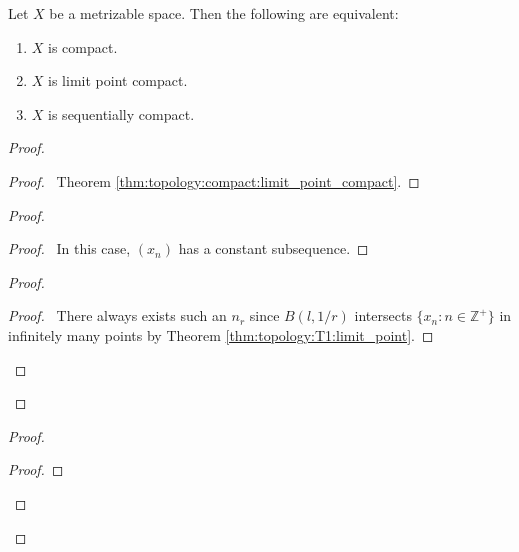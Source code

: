 \begin{thm}[DC]
  Let $X$ be a metrizable space. Then the following are equivalent:
  \begin{enumerate}
    \item $X$ is compact.
    \item $X$ is limit point compact.
    \item $X$ is sequentially compact.
  \end{enumerate}
\end{thm}

\begin{proof}
  \pf
  \begin{proof}
    \pf\ Theorem \ref{thm:topology:compact:limit_point_compact}.
  \end{proof}
  \begin{proof}
    \begin{proof}
      \pf\ In this case, $(x_n)$ has a constant subsequence.
    \end{proof}
    \begin{proof}
      \begin{proof}
        \pf\ There always exists such an $n_r$ since $B(l, 1/r)$ intersects
        $\{ x_n : n \in \mathbb{Z}^+ \}$ in infinitely many points by
        Theorem \ref{thm:topology:T1:limit_point}.
      \end{proof}
    \end{proof}
  \end{proof}
  \begin{proof}
    \begin{proof}
\end{proof}
\end{proof}
\end{proof}
